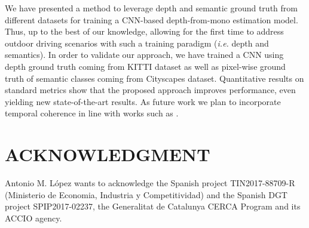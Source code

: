 \documentclass[letterpaper, 10 pt, conference]{ieeeconf}
\newcommand{\ie}{{\em i.e.}}
\begin{document}
We have presented a method to leverage depth and semantic ground truth from different datasets for training a CNN-based depth-from-mono estimation model. Thus, up to the best of our knowledge, allowing for the first time to address outdoor driving scenarios with such a training paradigm ({\ie} depth and semantics). In order to validate our approach, we have trained a CNN using depth ground truth coming from KITTI dataset as well as pixel-wise ground truth of semantic classes coming from Cityscapes dataset. Quantitative results on standard metrics show that the proposed approach improves performance, even yielding new state-of-the-art results. As future work we plan to incorporate temporal coherence in line with works such as \cite{Zhou:2017}.


 
\section*{ACKNOWLEDGMENT}
Antonio M. L\'opez wants to acknowledge the Spanish project TIN2017-88709-R (Ministerio de Economia, Industria y Competitividad) and the Spanish DGT project SPIP2017-02237, the Generalitat de Catalunya CERCA Program and its ACCIO agency.



\end{document}
